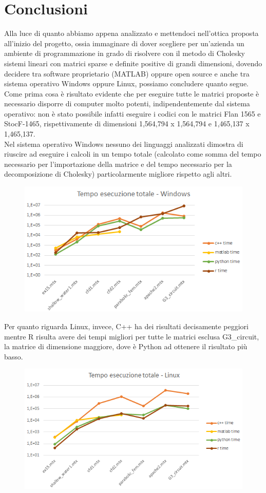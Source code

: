 \documentclass[a4paper,10pt]{article}
\begin{document}
\newpage

\section{Conclusioni}

Alla luce di quanto abbiamo appena analizzato e mettendoci nell’ottica proposta all’inizio del progetto, ossia immaginare di dover scegliere per un’azienda un ambiente di programmazione in grado di risolvere con il metodo di Cholesky sistemi lineari con matrici sparse e deﬁnite positive di grandi dimensioni, dovendo decidere tra software proprietario (MATLAB) oppure open source e anche tra sistema operativo Windows oppure Linux, possiamo concludere quanto segue.\\

Come prima cosa è risultato evidente che per eseguire tutte le matrici proposte è necessario disporre di computer molto potenti, indipendentemente dal sistema operativo: non è stato possibile infatti eseguire i codici con le matrici Flan 1565 e StocF-1465, rispettivamente di dimensioni 1,564,794 x 1,564,794 e 1,465,137 x 1,465,137.\\

Nel sistema operativo Windows nessuno dei linguaggi analizzati dimostra di riuscire ad eseguire i calcoli in un tempo totale (calcolato come somma del tempo necessario per l'importazione della matrice e del tempo necessario per la decomposizione di Cholesky) particolarmente migliore rispetto agli altri.

\begin{figure}[H]
\centering
  \includegraphics[width=0.6\linewidth]{img/tempototwin.png}
\end{figure}

Per quanto riguarda Linux, invece, C++ ha dei risultati decisamente peggiori mentre R risulta avere dei tempi migliori per tutte le matrici esclusa G3\_circuit, la matrice di dimensione maggiore, dove è Python ad ottenere il risultato più basso.

\begin{figure}[H]
\centering
  \includegraphics[width=0.6\linewidth]{img/tempototlinux.png}
\end{figure}
\end{document}
